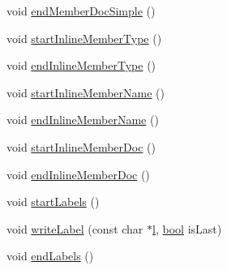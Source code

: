 \begin{DoxyCompactItemize}
void \hyperlink{class_html_generator_a1fdc8266bc0a32185f41ca73bfe73c9f}{end\+Member\+Doc\+Simple} ()
\item 
void \hyperlink{class_html_generator_ad8d74d63c27a79721411b61f079b1d23}{start\+Inline\+Member\+Type} ()
\item 
void \hyperlink{class_html_generator_abf118ca2952e998a7bf92872cbd27d78}{end\+Inline\+Member\+Type} ()
\item 
void \hyperlink{class_html_generator_aea75d506f4ee65a94d2d168de6bd9344}{start\+Inline\+Member\+Name} ()
\item 
void \hyperlink{class_html_generator_a696f93dbb5aa57ed49c272049cff3bb2}{end\+Inline\+Member\+Name} ()
\item 
void \hyperlink{class_html_generator_aba254fc8b8e76527e995671a36619228}{start\+Inline\+Member\+Doc} ()
\item 
void \hyperlink{class_html_generator_aa746fa4cf5bc3c2708a549b2fa4a4e78}{end\+Inline\+Member\+Doc} ()
\item 
void \hyperlink{class_html_generator_a117a5517c516573c07e780c560651619}{start\+Labels} ()
\item 
void \hyperlink{class_html_generator_a76009494c2f987f8a95cb79f0fc80250}{write\+Label} (const char $\ast$\hyperlink{060__command__switch_8tcl_aff56f84b49947b84b2a304f51cf8e678}{l}, \hyperlink{qglobal_8h_a1062901a7428fdd9c7f180f5e01ea056}{bool} is\+Last)
\item 
void \hyperlink{class_html_generator_a4a2190f8892cd76339ee7fcd827e48fc}{end\+Labels} ()
\end{DoxyCompactItemize}
